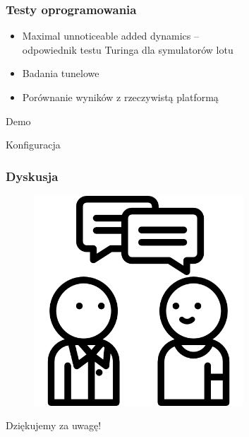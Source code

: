 \documentclass[aspectratio=169]{beamer}
\begin{document}
\begin{frame} %
	\frametitle{Testy oprogramowania} %
	\begin{itemize}
	\item<2-> Maximal unnoticeable added dynamics -- \\
		odpowiednik testu Turinga dla symulatorów lotu
	\item<3-> Badania tunelowe
	\item<4-> Porównanie wyników z rzeczywistą platformą
	\end{itemize}
\end{frame}

\begin{frame}
	  \begin{center}
	\Huge Demo
	\end{center}
\end{frame}

\begin{frame}
	  \begin{center}
	\Huge Konfiguracja
	\end{center}
\end{frame}

\begin{frame}
	\frametitle{Dyskusja}
	\begin{figure}
		\centering
		\includegraphics[width=0.7\textwidth]{questions.png}
	\end{figure}
\end{frame}


\begin{frame}
	  \begin{center}
	\Huge Dziękujemy za uwagę!
	\end{center}
\end{frame}
\end{document}
